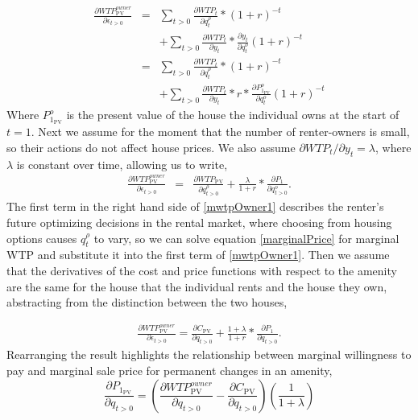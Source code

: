 \documentclass[ecta,nameyear,draft]{econsocart}
\theoremstyle{plain}
\theoremstyle{remark}
\begin{document}
\begin{eqnarray}
	\frac{\partial \mathit{WTP}^{\mathit{owner}}_{\mathrm{PV}}}{\partial \epsilon_{t>0}}&=&\sum_{t>0}\frac{\partial \mathit{WTP}_t}{\partial q^\rho_t}*(1+r)^{-t} \nonumber\\
	&& +\sum_{t>0}\frac{\partial \mathit{WTP}_t}{\partial y_t}*\frac{\partial y_t}{\partial q_t^o}(1+r)^{-t} \nonumber\\
	&=&\sum_{t>0}\frac{\partial \mathit{WTP}_t}{\partial q_t^\rho}*(1+r)^{-t}\nonumber\\
	&& +\sum_{t>0}\frac{\partial \mathit{WTP}_t}{\partial y_t}*r*\frac{\partial P^o_{1_\mathrm{PV}}}{\partial q_t^o}(1+r)^{-t} \nonumber
\end{eqnarray}
Where $P^o_{1_\mathrm{PV}}$ is the present value of the house the individual owns at the start of $t=1$. Next we assume for the moment that the number of renter-owners is small, so their actions do not affect house prices. We also assume $\partial \mathit{WTP}_t/\partial y_t=\lambda$, where $\lambda$ is constant over time, allowing us to write,
\begin{eqnarray}
	\frac{\partial \mathit{WTP}^{\mathit{owner}}_{\mathrm{PV}}}{\partial \epsilon_{t>0}} 
	&=&\frac{\partial \mathit{WTP_{\mathrm{PV}}}}{\partial q^\rho_{t>0}} + \frac{\lambda}{1+r}*\frac{\partial P_1}{\partial q^o_{t>0}} \label{mwtpOwner1}.
\end{eqnarray}
The first term in the right hand side of \ref{mwtpOwner1} describes the renter's future optimizing decisions in the rental market, where choosing from housing options causes $q_t^\rho$ to vary, so we can solve equation \ref{marginalPrice} for marginal WTP and substitute it into the first term of \ref{mwtpOwner1}. Then we assume that the derivatives of the cost and price functions with respect to the amenity are the same for the house that the individual rents and the house they own, abstracting from the distinction between the two houses, 

\begin{eqnarray*}
	\frac{\partial \mathit{WTP}^{\mathit{owner}}_{\mathrm{PV}}}{\partial \epsilon_{t>0}} =	\frac{\partial C_{\mathrm{PV}}}{\partial q_{t>0}}+\frac{1+\lambda}{1+r}*\frac{\partial P_1}{\partial q_{t>0}}.
\end{eqnarray*}
Rearranging the result highlights the relationship between marginal willingness to pay and marginal sale price for permanent changes in an amenity,
\begin{equation*}
	\frac{\partial P_{1_{\mathrm{PV}}}} {\partial q_{t>0}}=\left(
	\frac{\partial \mathit{WTP}^{\mathit{owner}}_{\mathrm{PV}}}{\partial q_{t>0}}-\frac{\partial C_{\mathrm{PV}}}{\partial q_{t>0}}\right)\left(\frac{1}{1+\lambda}\right)
\end{equation*}
\end{document}

